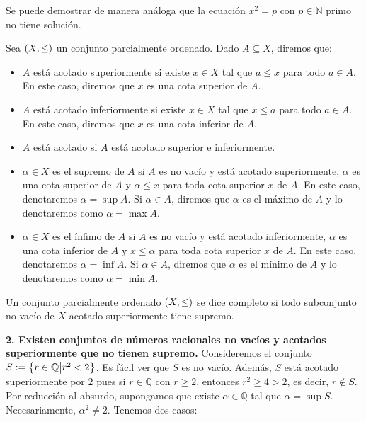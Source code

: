 Se puede demostrar de manera análoga que la ecuación $x^2=p$ con $p\in\mathbb{N}$ primo no tiene solución.

\begin{definition}
  \rm Sea $\left(X,\leq\right)$ un conjunto parcialmente ordenado. Dado $A\subseteq X$, diremos que:

  \begin{itemize}
    \item $A$ está acotado superiormente si existe $x\in X$ tal que $a\leq x$ para todo $a\in A$. En este caso, diremos que $x$ es una cota superior de $A$.
    \item $A$ está acotado inferiormente si existe $x\in X$ tal que $x\leq a$ para todo $a\in A$. En este caso, diremos que $x$ es una cota inferior de $A$.
    \item $A$ está acotado si $A$ está acotado superior e inferiormente.
    \item $\alpha\in X$ es el supremo de $A$ si $A$ es no vacío y está acotado superiormente, $\alpha$ es una cota superior de $A$ y $\alpha\leq x$ para toda cota superior $x$ de $A$. En este caso, denotaremos $\alpha=\sup A$. Si $\alpha\in A$, diremos que $\alpha$ es el máximo de $A$ y lo denotaremos como $\alpha=\max A$.
    \item $\alpha\in X$ es el ínfimo de $A$ si $A$ es no vacío y está acotado inferiormente, $\alpha$ es una cota inferior de $A$ y $x\leq \alpha$ para toda cota superior $x$ de $A$. En este caso, denotaremos $\alpha=\inf A$. Si $\alpha\in A$, diremos que $\alpha$ es el mínimo de $A$ y lo denotaremos como $\alpha=\min A$.
  \end{itemize}
\end{definition}


\begin{definition}
  \rm Un conjunto parcialmente ordenado $\left(X,\leq\right)$ se dice completo si todo subconjunto no vacío de $X$ acotado superiormente tiene supremo.
\end{definition}

\textbf{2. Existen conjuntos de números racionales no vacíos y acotados superiormente que no tienen supremo.} Consideremos el conjunto $S:=\left\{r\in\mathbb{Q}\middle|r^2<2\right\}$. Es fácil ver que $S$ es no vacío. Además, $S$ está acotado superiormente por $2$ pues si $r\in\mathbb{Q}$ con $r\geq 2$, entonces $r^2\geq 4>2$, es decir, $r\notin S$. Por reducción al absurdo, supongamos que existe $\alpha\in\mathbb{Q}$ tal que $\alpha=\sup S$. Necesariamente, $\alpha^2\neq 2$. Tenemos dos casos:

